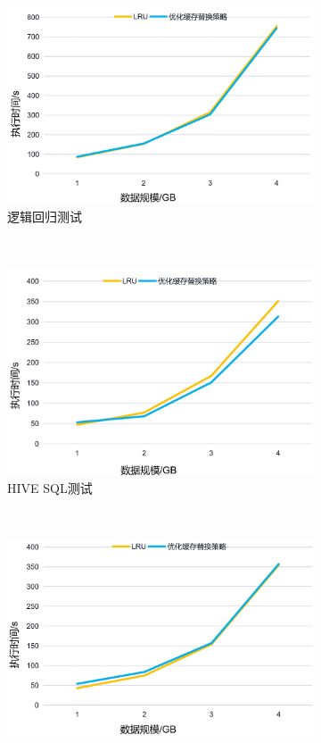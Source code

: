 \begin{figure}[!htbp]
    \centering
    \begin{subfigure}[b]{0.45\linewidth}
      \includegraphics[width=\textwidth]{Img/lr4.jpg}
      \caption{逻辑回归测试}
      \label{fig:lr-cache}
    \end{subfigure}%
    ~%
    \begin{subfigure}[b]{0.45\linewidth}
      \includegraphics[width=\textwidth]{Img/hive4.jpg}
      \caption{HIVE SQL测试}
      \label{fig:hive-cache}
    \end{subfigure}
    \\%
    \begin{subfigure}[b]{0.45\linewidth}
      \includegraphics[width=\textwidth]{Img/pg4.jpg}

\end{subfigure}
\end{figure}
